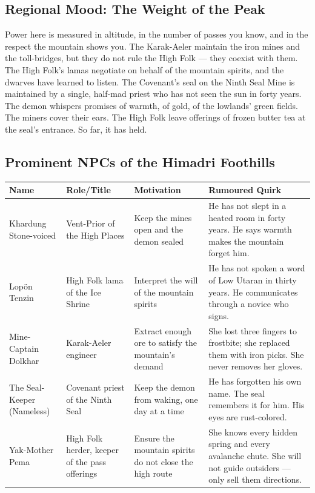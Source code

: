 \subsection*{Regional Mood: The Weight of the Peak}

Power here is measured in altitude, in the number of passes you know, and in the respect the mountain shows you. The Karak-Aeler maintain the iron mines and the toll-bridges, but they do not rule the High Folk --- they coexist with them. The High Folk's lamas negotiate on behalf of the mountain spirits, and the dwarves have learned to listen. The Covenant's seal on the Ninth Seal Mine is maintained by a single, half-mad priest who has not seen the sun in forty years. The demon whispers promises of warmth, of gold, of the lowlands' green fields. The miners cover their ears. The High Folk leave offerings of frozen butter tea at the seal's entrance. So far, it has held.

\subsection*{Prominent NPCs of the Himadri Foothills}
\label{sec:himadri-npcs}

\begin{longtable}{|p{}|p{}|p{}|p{}|}
\hline
\textbf{Name} & \textbf{Role/Title} & \textbf{Motivation} & \textbf{Rumoured Quirk} \\
\hline
Khardung Stone-voiced & Vent-Prior of the High Places & Keep the mines open and the demon sealed & He has not slept in a heated room in forty years. He says warmth makes the mountain forget him. \\
\hline
Lopön Tenzin & High Folk lama of the Ice Shrine & Interpret the will of the mountain spirits & He has not spoken a word of Low Utaran in thirty years. He communicates through a novice who signs. \\
\hline
Mine-Captain Dolkhar & Karak-Aeler engineer & Extract enough ore to satisfy the mountain's demand & She lost three fingers to frostbite; she replaced them with iron picks. She never removes her gloves. \\
\hline
The Seal-Keeper (Nameless) & Covenant priest of the Ninth Seal & Keep the demon from waking, one day at a time & He has forgotten his own name. The seal remembers it for him. His eyes are rust-colored. \\
\hline
Yak-Mother Pema & High Folk herder, keeper of the pass offerings & Ensure the mountain spirits do not close the high route & She knows every hidden spring and every avalanche chute. She will not guide outsiders --- only sell them directions. \\
\hline
\end{longtable}

